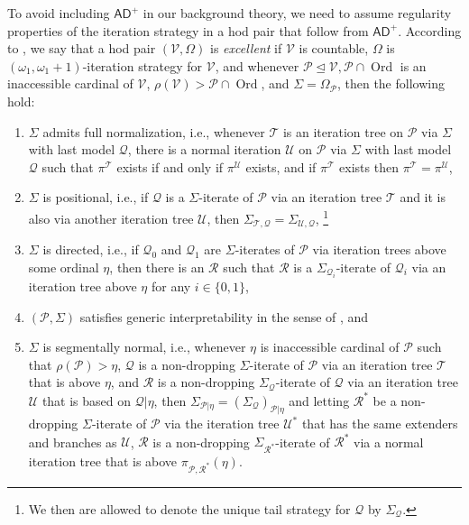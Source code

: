 \documentclass{amsart}
\DeclareMathOperator{\ord}{Ord}
\begin{document}
To avoid including $\mathsf{AD}^+$ in our background theory, we need to assume regularity properties of the iteration strategy in a hod pair that follow from $\mathsf{AD}^+$.
According to \cite{CoveringChang}, we say that a hod pair $(\mathcal{V}, \Omega)$ is \emph{excellent} if $\mathcal{V}$ is countable, $\Omega$ is $(\omega_1, \omega_1+1)$-iteration strategy for $\mathcal{V}$, and whenever $\mathcal{P}\trianglelefteq\mathcal{V}, \mathcal{P}\cap\ord$ is an inaccessible cardinal of $\mathcal{V}$, $\rho(\mathcal{V})>\mathcal{P}\cap\ord$, and $\Sigma=\Omega_{\mathcal{P}}$, then the following hold:
\begin{enumerate}
    \item $\Sigma$ admits full normalization, i.e., whenever $\mathcal{T}$ is an iteration tree on $\mathcal{P}$ via $\Sigma$ with last model $\mathcal{Q}$, there is a normal iteration $\mathcal{U}$ on $\mathcal{P}$ via $\Sigma$ with last model $\mathcal{Q}$ such that $\pi^{\mathcal{T}}$ exists if and only if $\pi^{\mathcal{U}}$ exists, and if $\pi^{\mathcal{T}}$ exists then $\pi^{\mathcal{T}}=\pi^{\mathcal{U}}$,
    \item $\Sigma$ is positional, i.e., if $\mathcal{Q}$ is a $\Sigma$-iterate of $\mathcal{P}$ via an iteration tree $\mathcal{T}$ and it is also via another iteration tree $\mathcal{U}$, then $\Sigma_{\mathcal{T}, \mathcal{Q}}=\Sigma_{\mathcal{U}, \mathcal{Q}}$,
    \footnote{We then are allowed to denote the unique tail strategy for $\mathcal{Q}$ by $\Sigma_{\mathcal{Q}}$.}
    \item $\Sigma$ is directed, i.e., if $\mathcal{Q}_0$ and $\mathcal{Q}_1$ are $\Sigma$-iterates of $\mathcal{P}$ via iteration trees above some ordinal $\eta$, then there is an $\mathcal{R}$ such that $\mathcal{R}$ is a $\Sigma_{\mathcal{Q}_i}$-iterate of $\mathcal{Q}_i$ via an iteration tree above $\eta$ for any $i\in\{0, 1\}$,
    \item $(\mathcal{P}, \Sigma)$ satisfies generic interpretability in the sense of \cite[Theorem 11.1.1]{CPMP}, and
    \item $\Sigma$ is segmentally normal, i.e., whenever $\eta$ is inaccessible cardinal of $\mathcal{P}$ such that $\rho(\mathcal{P})>\eta$, $\mathcal{Q}$ is a non-dropping $\Sigma$-iterate of $\mathcal{P}$ via an iteration tree $\mathcal{T}$ that is above $\eta$, and $\mathcal{R}$ is a non-dropping $\Sigma_{\mathcal{Q}}$-iterate of $\mathcal{Q}$ via an iteration tree $\mathcal{U}$ that is based on $\mathcal{Q}\vert\eta$, then $\Sigma_{\mathcal{P}\vert\eta}=(\Sigma_{\mathcal{Q}})_{\mathcal{P}\vert\eta}$ and letting $\mathcal{R}^*$ be a non-dropping $\Sigma$-iterate of $\mathcal{P}$ via the iteration tree $\mathcal{U}^*$ that has the same extenders and branches as $\mathcal{U}$, $\mathcal{R}$ is a non-dropping $\Sigma_{\mathcal{R}^*}$-iterate of $\mathcal{R}^*$ via a normal iteration tree that is above $\pi_{\mathcal{P}, \mathcal{R}^*}(\eta)$.
\end{enumerate}
\end{document}
